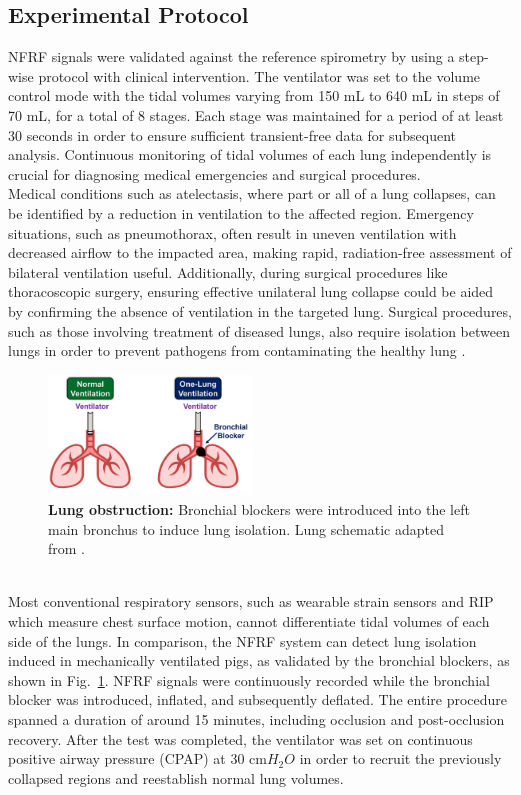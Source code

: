 \documentclass[journal]{IEEEtran}
\begin{document}
\subsection{Experimental Protocol}
NFRF signals were validated against the reference spirometry by using a step-wise protocol with clinical intervention. The ventilator was set to the volume control mode with the tidal volumes varying from 150 mL to 640 mL in steps of 70 mL, for a total of 8 stages. Each stage was maintained for a period of at least 30 seconds in order to ensure sufficient transient-free data for subsequent analysis. Continuous monitoring of tidal volumes of each lung independently is crucial for diagnosing medical emergencies and surgical procedures. \\
Medical conditions such as atelectasis, where part or all of a lung collapses, can be identified by a reduction in ventilation to the affected region. Emergency situations, such as pneumothorax, often result in uneven ventilation with decreased airflow to the impacted area, making rapid, radiation-free assessment of bilateral ventilation useful. Additionally, during surgical procedures like thoracoscopic surgery, ensuring effective unilateral lung collapse could be aided by confirming the absence of ventilation in the targeted lung. Surgical procedures, such as those involving treatment of diseased lungs, also require isolation between lungs in order to prevent pathogens from contaminating the healthy lung \cite{smithLungIsolationAnesthesia2024}. 
\begin{figure}[htpb]
\centering
\includegraphics[width=0.48\textwidth]{occlusion.jpg}
\caption{\textbf{Lung obstruction:} Bronchial blockers were introduced into the left main bronchus to induce lung isolation. Lung schematic adapted from \cite{lungImage}.}
\label{fig:occlusion}
\end{figure}\\
Most conventional respiratory sensors, such as wearable strain sensors and RIP which measure chest surface motion, cannot differentiate tidal volumes of each side of the lungs. In comparison, the NFRF system can detect lung isolation induced in mechanically ventilated pigs, as validated by the bronchial blockers, as shown in Fig.~\ref{fig:occlusion}. NFRF signals were continuously recorded while the bronchial blocker was introduced, inflated, and subsequently deflated. The entire procedure spanned a duration of around 15 minutes, including occlusion and post-occlusion recovery. After the test was completed, the ventilator was set on continuous positive airway pressure (CPAP) at 30 cm$H_{2}O$ in order to recruit the previously collapsed regions and reestablish normal lung volumes.  
\end{document}
